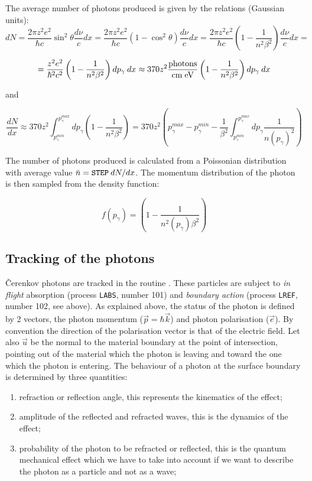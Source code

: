 The average number of photons produced is given by the relations
(Gaussian units):
\[
dN =
\frac{2 \pi z^{2}e^{2}}{\hbar c} \sin^{2} \theta \frac{d \nu}{c} dx =
\frac{2 \pi z^{2}e^{2}}{\hbar c} \left ( 1- \cos^{2} \theta
\right ) \frac{d \nu}{c} dx =
\frac{2 \pi z^{2}e^{2}}{\hbar c} \left ( 1- \frac{1}{n^{2} \beta^{2}}
\right ) \frac{d \nu}{c} dx =
\]

\[
= \frac{z^{2}e^{2}}{\hbar^{2} c^{2}} \left ( 1- \frac{1}{n^{2} \beta^{2}}
\right ) dp_{\gamma} \: dx \approx
370 z^{2} \frac{\rm photons}{\rm cm \; eV}
\left ( 1- \frac{1}{n^{2} \beta^{2}} \right ) dp_{\gamma} \: dx
\]

and

\[
\frac{dN}{dx} \approx 370 z^{2}
\int^{p_{\gamma}^{max}}_{p_{\gamma}^{min}}{dp_{\gamma}
\left ( 1- \frac{1}{n^{2} \beta^{2}} \right ) }
= 370 z^{2} \left ( p_{\gamma}^{max} -
p_{\gamma}^{min} - \frac{1}{\beta^{2}}
\int^{p_{\gamma}^{max}}_{p_{\gamma}^{min}}{dp_{\gamma}
\frac{1}{n(p_{\gamma})^{2}}} \right )
\]

The number of photons produced is calculated from a Poissonian distribution
with average value $\bar{n} = \mbox{\tt STEP} \: dN/dx$. 
The momentum distribution of
the photon is then sampled from the density function:

\[
f(p_{\gamma}) = \left ( 1- \frac{1}{n^{2}(p_{\gamma}) \beta^{2}} \right )
\]

\subsection{Tracking of the photons}

\v{C}erenkov photons are tracked in the routine . 
These particles are subject to {\it in flight} absorption (process
{\tt LABS}, number 101) and {\it boundary action} 
(process {\tt LREF}, number 102, see above). As explained
above, the status of the photon is defined by 2 vectors, the 
photon momentum ($\vec{p}=\hbar \vec{k}$) and photon polarisation 
($\vec{e}$). By convention the direction of the polarisation vector
is that of the electric field. Let also $\vec{u}$ be the normal to
the material boundary at the point of intersection, pointing 
out of the material which the photon is leaving and toward the one
which the photon is entering.
The behaviour of a photon at the surface
boundary is determined by three quantities:
\begin{enumerate}
\item refraction or reflection angle, this represents the kinematics
of the effect;
\item amplitude of the reflected and refracted waves, this is 
the dynamics of the effect;
\item probability of the photon to be refracted or reflected,
this is the quantum mechanical effect which we have to take
into account if we want to describe the photon as a particle and
not as a wave;
\end{enumerate}

